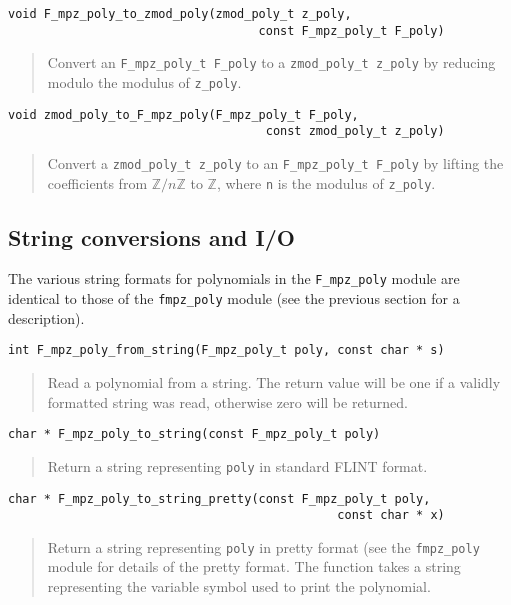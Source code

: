 \documentclass[a4paper,10pt]{article}
\newcommand{\Z}{\mathbb{Z}}
\newcommand{\code}{\lstinline}
\begin{document}
\begin{lstlisting}
void F_mpz_poly_to_zmod_poly(zmod_poly_t z_poly, 
                                   const F_mpz_poly_t F_poly)
\end{lstlisting}
\begin{quote}
Convert an \code{F_mpz_poly_t F_poly} to a \code{zmod_poly_t z_poly} by reducing modulo the modulus 
of \code{z_poly}.
\end{quote}

\begin{lstlisting}
void zmod_poly_to_F_mpz_poly(F_mpz_poly_t F_poly, 
                                    const zmod_poly_t z_poly)
\end{lstlisting}
\begin{quote}
Convert a \code{zmod_poly_t z_poly} to an \code{F_mpz_poly_t F_poly} by lifting the coefficients 
from $\Z/n\Z$ to $\Z$, where \code{n} is the modulus of \code{z_poly}.
\end{quote}

\subsection{String conversions and I/O}

The various string formats for polynomials in the \code{F_mpz_poly} module are identical to those
of the \code{fmpz_poly} module (see the previous section for a description).

\begin{lstlisting}
int F_mpz_poly_from_string(F_mpz_poly_t poly, const char * s)
\end{lstlisting}
\begin{quote}
Read a polynomial from a string. The return value will be one if a validly formatted string was
read, otherwise zero will be returned.
\end{quote}

\begin{lstlisting}
char * F_mpz_poly_to_string(const F_mpz_poly_t poly)
\end{lstlisting}
\begin{quote}
Return a string representing \code{poly} in standard FLINT format.
\end{quote}

\begin{lstlisting}
char * F_mpz_poly_to_string_pretty(const F_mpz_poly_t poly, 
                                              const char * x)
\end{lstlisting}
\begin{quote}
Return a string representing \code{poly} in pretty format (see the \code{fmpz_poly} module for
details of the pretty format. The function takes a string representing the variable symbol 
used to print the polynomial.
\end{quote}
\end{document}
